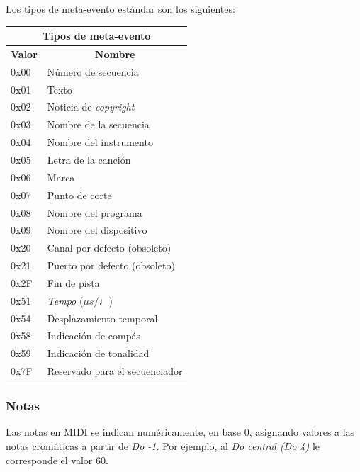 \smallskip

Los tipos de meta-evento estándar son los siguientes:

\smallskip

\begin{center}
	\begin{tabular}{|l|l|}
		\hline \multicolumn{2}{|c|}{\textbf{Tipos de meta-evento}} \\
		\hline \multicolumn{1}{|c|}{\textbf{Valor}} & \multicolumn{1}{c|}{\textbf{Nombre}} \\
		\hline 0x00 & Número de secuencia \\
		\hline 0x01 & Texto \\
		\hline 0x02 & Noticia de \textit{copyright} \\
		\hline 0x03 & Nombre de la secuencia \\
		\hline 0x04 & Nombre del instrumento \\
		\hline 0x05 & Letra de la canción \\
		\hline 0x06 & Marca \\
		\hline 0x07 & Punto de corte \\
		\hline 0x08 & Nombre del programa \\
		\hline 0x09 & Nombre del dispositivo \\
		\hline 0x20 & Canal por defecto (obsoleto) \\
		\hline 0x21 & Puerto por defecto (obsoleto) \\
		\hline 0x2F & Fin de pista \\
		\hline 0x51 & \textit{Tempo} ($\mu s/\quarternote$) \\
		\hline 0x54 & Desplazamiento temporal \\
		\hline 0x58 & Indicación de compás \\
		\hline 0x59 & Indicación de tonalidad \\
		\hline 0x7F & Reservado para el secuenciador \\
		\hline 
	\end{tabular}
	\smallskip
\end{center}

\smallskip

\subsubsection{Notas}

Las notas en \acrshort{MIDI} se indican numéricamente, en base 0, asignando valores a las notas cromáticas a partir de \textit{Do -1}. Por ejemplo, al \textit{Do central (Do 4)} le corresponde el valor 60.

